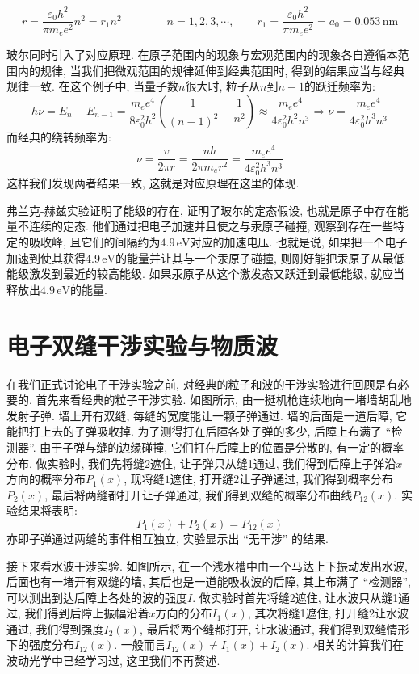 \[
r = \frac{\varepsilon_0 h^2}{\pi m_e e^2} n^2 = r_1 n^2 \qquad \qquad n = 1, 2, 3, \cdots, \qquad r_1 = \frac{\varepsilon_0 h^2}{\pi m_e e^2} = a_0 = 0.053\,\mathrm{nm}
\]

玻尔同时引入了对应原理. 在原子范围内的现象与宏观范围内的现象各自遵循本范围内的规律, 当我们把微观范围的规律延伸到经典范围时, 得到的结果应当与经典规律一致. 在这个例子中, 当量子数$n$很大时, 粒子从$n$到$n-1$的跃迁频率为:
\[
h\nu = E_n - E_{n-1} = \frac{m_e e^4}{8 \varepsilon_0^2 h^2} \left( \frac{1}{(n-1)^2} - \frac{1}{n^2} \right) \approx \frac{m_e e^4}{4 \varepsilon_0^2 h^2 n^3} \Rightarrow \nu = \frac{m_e e^4}{4 \varepsilon_0^2 h^3 n^3}
\]
而经典的绕转频率为:
\[
\nu = \frac{v}{2\pi r} = \frac{nh}{2\pi m_e r^2} = \frac{m_e e^4}{4 \varepsilon_0^2 h^3 n^3}
\]
这样我们发现两者结果一致, 这就是对应原理在这里的体现.

弗兰克-赫兹实验证明了能级的存在, 证明了玻尔的定态假设, 也就是原子中存在能量不连续的定态. 他们通过把电子加速并且使之与汞原子碰撞, 观察到存在一些特定的吸收峰, 且它们的间隔约为$4.9\,\mathrm{eV}$对应的加速电压. 也就是说, 如果把一个电子加速到使其获得$4.9\,\mathrm{eV}$的能量并让其与一个汞原子碰撞, 则刚好能把汞原子从最低能级激发到最近的较高能级. 如果汞原子从这个激发态又跃迁到最低能级, 就应当释放出$4.9\,\mathrm{eV}$的能量.

\section{电子双缝干涉实验与物质波}
在我们正式讨论电子干涉实验之前, 对经典的粒子和波的干涉实验进行回顾是有必要的. 首先来看经典的粒子干涉实验. 如图所示, 由一挺机枪连续地向一堵墙胡乱地发射子弹. 墙上开有双缝, 每缝的宽度能让一颗子弹通过. 墙的后面是一道后障, 它能把打上去的子弹吸收掉. 为了测得打在后障各处子弹的多少, 后障上布满了 ``检测器''. 由于子弹与缝的边缘碰撞, 它们打在后障上的位置是分散的, 有一定的概率分布. 做实验时, 我们先将缝$2$遮住, 让子弹只从缝1通过, 我们得到后障上子弹沿$x$方向的概率分布$P_1(x)$, 现将缝$1$遮住, 打开缝$2$让子弹通过, 我们得到概率分布$P_2(x)$, 最后将两缝都打开让子弹通过, 我们得到双缝的概率分布曲线$P_{12}(x)$. 实验结果将表明:
\[
P_1(x)+P_2(x)=P_{12}(x)
\]
亦即子弹通过两缝的事件相互独立, 实验显示出 ``无干涉'' 的结果.

接下来看水波干涉实验. 如图所示, 在一个浅水槽中由一个马达上下振动发出水波, 后面也有一堵开有双缝的墙, 其后也是一道能吸收波的后障, 其上布满了 ``检测器'', 可以测出到达后障上各处的波的强度$I$. 做实验时首先将缝2遮住, 让水波只从缝1通过, 我们得到后障上振幅沿着$x$方向的分布$I_1(x)$, 其次将缝1遮住, 打开缝2让水波通过, 我们得到强度$I_2(x)$, 最后将两个缝都打开, 让水波通过, 我们得到双缝情形下的强度分布$I_{12}(x)$. 一般而言$I_{12}(x)\neq I_1(x)+I_2(x)$. 相关的计算我们在波动光学中已经学习过, 这里我们不再赘述.

